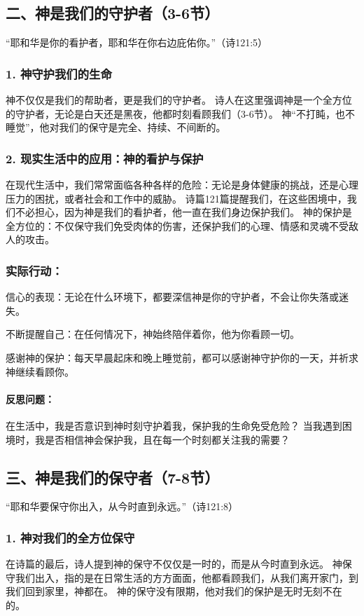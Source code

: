 \documentclass[a4paper, 12pt]{article}
\begin{document}
\subsection*{二、神是我们的守护者（3-6节）}
“耶和华是你的看护者，耶和华在你右边庇佑你。”（诗121:5）

\subsubsection*{1. 神守护我们的生命}
神不仅仅是我们的帮助者，更是我们的守护者。
诗人在这里强调神是一个全方位的守护者，无论是白天还是黑夜，他都时刻看顾我们（3-6节）。
神“不打盹，也不睡觉”，他对我们的保守是完全、持续、不间断的。
\subsubsection*{2. 现实生活中的应用：神的看护与保护}
在现代生活中，我们常常面临各种各样的危险：无论是身体健康的挑战，还是心理压力的困扰，或者社会和工作中的威胁。
诗篇121篇提醒我们，在这些困境中，我们不必担心，因为神是我们的看护者，他一直在我们身边保护我们。
神的保护是全方位的：不仅保守我们免受肉体的伤害，还保护我们的心理、情感和灵魂不受敌人的攻击。
\subsubsection*{实际行动：}

\hspace{0.6cm}信心的表现：无论在什么环境下，都要深信神是你的守护者，不会让你失落或迷失。

不断提醒自己：在任何情况下，神始终陪伴着你，他为你看顾一切。

感谢神的保护：每天早晨起床和晚上睡觉前，都可以感谢神守护你的一天，并祈求神继续看顾你。
\paragraph*{反思问题：}

在生活中，我是否意识到神时刻守护着我，保护我的生命免受危险？
当我遇到困境时，我是否相信神会保护我，且在每一个时刻都关注我的需要？
\subsection*{三、神是我们的保守者（7-8节）}
“耶和华要保守你出入，从今时直到永远。”（诗121:8）

\subsubsection*{1. 神对我们的全方位保守}
在诗篇的最后，诗人提到神的保守不仅仅是一时的，而是从今时直到永远。
神保守我们出入，指的是在日常生活的方方面面，他都看顾我们，从我们离开家门，到我们回到家里，神都在。
神的保守没有限期，他对我们的保护是无时无刻不在的。
\end{document}
